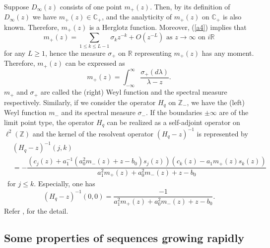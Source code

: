 \documentclass[a4paper]{article}%
\begin{document}
Suppose $D_{\infty}(z)$ consists of one point $m_{+}\left(  z\right)  $. Then,
by its definition of $D_{\infty}(z)$ we have $m_{+}\left(  z\right)
\in\mathbb{C}_{+}$, and the analyticity of $m_{+}\left(  z\right)  $ on
$\mathbb{C}_{+}$ is also known. Therefore, $m_{+}\left(  z\right)  $ is a
Herglotz function. Moreover, (\ref{a4}) implies that
\[
m_{+}\left(  z\right)  =\sum_{1\leq k\leq L-1}\sigma_{k}z^{-k}+O\left(
z^{-L}\right)  \text{ \ as }z\rightarrow\infty\text{ \ on }i\mathbb{R}%
\]
for any $L\geq1$, hence the measure $\sigma_{+}$ on $\mathbb{R}$ representing
$m_{+}\left(  z\right)  $ has any moment. Therefore, $m_{+}\left(  z\right)  $
can be expressed as%
\[
m_{+}\left(  z\right)  =\int_{-\infty}^{\infty}\dfrac{\sigma_{+}\left(
d\lambda\right)  }{\lambda-z}\text{.}%
\]
$m_{+}$ and $\sigma_{+}$ are called the (right) Weyl function and the spectral
measure respectively. Similarly, if we consider the operator $H_{q}$ on
$\mathbb{Z}_{-}$, we have the (left) Weyl function $m_{-}$ and its spectral
measure $\sigma_{-}$. If the boundaries $\pm\infty$ are of the limit point
type, the operator $H_{q}$ can be realized as a self-adjoint operator on
$\ell^{2}\left(  \mathbb{Z}\right)  $ and the kernel of the resolvent operator
$\left(  H_{q}-z\right)  ^{-1}$ is represented by%
\begin{align*}
&  \left(  H_{q}-z\right)  ^{-1}\left(  j,k\right) \\
&  =-\dfrac{\left(  c_{j}(z)+a_{1}^{-1}\left(  a_{0}^{2}m_{-}\left(  z\right)
+z-b_{0}\right)  s_{j}(z)\right)  \left(  c_{k}(z)-a_{1}m_{+}\left(  z\right)
s_{k}(z)\right)  }{a_{1}^{2}m_{+}\left(  z\right)  +a_{0}^{2}m_{-}\left(
z\right)  +z-b_{0}}%
\end{align*}
\ for $j\leq k$. Especially, one has%
\begin{equation}
\left(  H_{q}-z\right)  ^{-1}\left(  0,0\right)  =\dfrac{-1}{a_{1}^{2}%
m_{+}\left(  z\right)  +a_{0}^{2}m_{-}\left(  z\right)  +z-b_{0}}\text{.}
\label{a5}%
\end{equation}
Refer \cite{t}, \cite{z} for the detail.

\subsection{Some properties of sequences growing rapidly}
\end{document}
